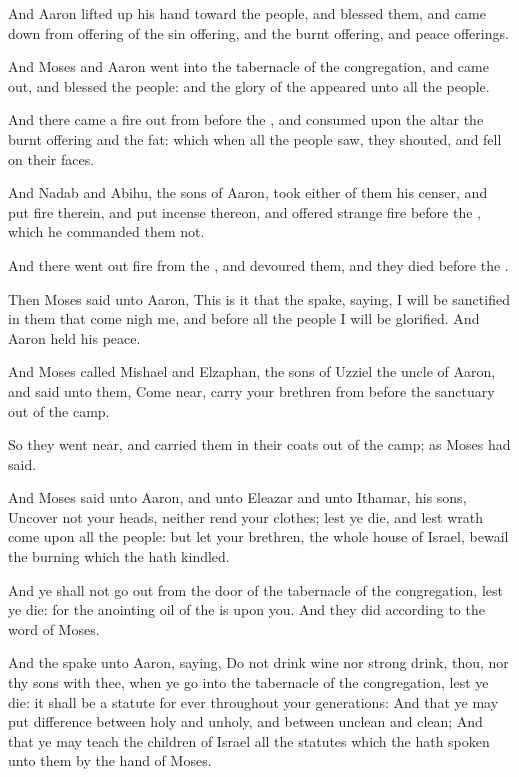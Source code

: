 \Verse And Aaron lifted up his hand toward the people, and blessed them, and came down from offering of the sin offering, and the burnt offering, and peace offerings.

\Verse And Moses and Aaron went into the tabernacle of the congregation, and came out, and blessed the people: and the glory of the \LORD appeared unto all the people.

\Verse And there came a fire out from before the \LORD, and consumed upon the altar the burnt offering and the fat: which when all the people saw, they shouted, and fell on their faces.

\Chapter
\Verse And Nadab and Abihu, the sons of Aaron, took either of them his censer, and put fire therein, and put incense thereon, and offered strange fire before the \LORD, which he commanded them not.

\Verse And there went out fire from the \LORD, and devoured them, and they died before the \LORD.

\Verse Then Moses said unto Aaron, This is it that the \LORD spake, saying, I will be sanctified in them that come nigh me, and before all the people I will be glorified. And Aaron held his peace.

\Verse And Moses called Mishael and Elzaphan, the sons of Uzziel the uncle of Aaron, and said unto them, Come near, carry your brethren from before the sanctuary out of the camp.

\Verse So they went near, and carried them in their coats out of the camp; as Moses had said.

\Verse And Moses said unto Aaron, and unto Eleazar and unto Ithamar, his sons, Uncover not your heads, neither rend your clothes; lest ye die, and lest wrath come upon all the people: but let your brethren, the whole house of Israel, bewail the burning which the \LORD hath kindled.

\Verse And ye shall not go out from the door of the tabernacle of the congregation, lest ye die: for the anointing oil of the \LORD is upon you. And they did according to the word of Moses.

\Verse And the \LORD spake unto Aaron, saying, \Verse Do not drink wine nor strong drink, thou, nor thy sons with thee, when ye go into the tabernacle of the congregation, lest ye die: it shall be a statute for ever throughout your generations: \Verse And that ye may put difference between holy and unholy, and between unclean and clean; \Verse And that ye may teach the children of Israel all the statutes which the \LORD hath spoken unto them by the hand of Moses.

